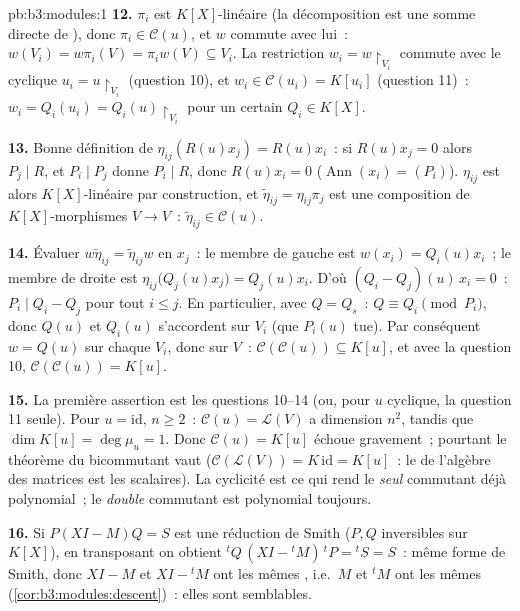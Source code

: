 \begin{solution}{pb:b3:modules:1}
\textbf{12.} $\pi_i$ est $K[X]$-linéaire (la décomposition est
une somme directe de ), donc $\pi_i \in \mathcal
C(u)$, et $w$ commute avec lui~: $w(V_i) = w\pi_i(V) = \pi_i
w(V) \subseteq V_i$. La restriction $w_i =
w\restriction_{V_i}$ commute avec le cyclique $u_i =
u\restriction_{V_i}$ (question 10), et $w_i \in \mathcal
C(u_i) = K[u_i]$ (question 11)~: $w_i = Q_i(u_i) =
Q_i(u)\restriction_{V_i}$ pour un certain $Q_i \in K[X]$.

\textbf{13.} Bonne définition de $\eta_{ij}(R(u)x_j) =
R(u)x_i$~: si $R(u)x_j = 0$ alors $P_j \mid R$, et $P_i \mid
P_j$ donne $P_i \mid R$, donc $R(u)x_i = 0$
($\operatorname{Ann}(x_i) = (P_i)$). $\eta_{ij}$ est alors
$K[X]$-linéaire par construction, et $\tilde\eta_{ij} =
\eta_{ij}\pi_j$ est une composition de $K[X]$-morphismes $V
\to V$~: $\tilde\eta_{ij} \in \mathcal C(u)$.

\textbf{14.} Évaluer $w\tilde\eta_{ij} = \tilde\eta_{ij}w$ en
$x_j$~: le membre de gauche est $w(x_i) = Q_i(u)x_i$~; le
membre de droite est $\eta_{ij}\bigl(Q_j(u)x_j\bigr) =
Q_j(u)x_i$. D'où $(Q_i - Q_j)(u)\,x_i = 0$~: $P_i \mid Q_i -
Q_j$ pour tout $i \leq j$. En particulier, avec $Q = Q_s$~: $Q
\equiv Q_i \pmod{P_i}$, donc $Q(u)$ et $Q_i(u)$ s'accordent sur
$V_i$ (que $P_i(u)$ tue). Par conséquent $w = Q(u)$ sur chaque
$V_i$, donc sur $V$~: $\mathcal C(\mathcal C(u)) \subseteq
K[u]$, et avec la question 10, $\mathcal C(\mathcal C(u)) =
K[u]$.

\textbf{15.} La première assertion est les questions 10--14
(ou, pour $u$ cyclique, la question 11 seule). Pour $u =
\mathrm{id}$, $n \geq 2$~: $\mathcal C(u) = \mathcal L(V)$ a
dimension $n^2$, tandis que $\dim K[u] = \deg\mu_u = 1$. Donc
$\mathcal C(u) = K[u]$ échoue gravement~; pourtant le théorème
du bicommutant vaut ($\mathcal C(\mathcal L(V)) =
K\,\mathrm{id} = K[u]$~: le  de l'algèbre des matrices
est les scalaires). La cyclicité est ce qui rend le
\emph{seul} commutant déjà polynomial~; le \emph{double}
commutant est polynomial toujours.

\textbf{16.} Si $P(XI - M)Q = S$ est une réduction de Smith
($P, Q$ inversibles sur $K[X]$), en transposant on obtient
${}^tQ\,(XI - {}^tM)\,{}^tP = {}^tS = S$~: même forme de Smith,
donc $XI - M$ et $XI - {}^tM$ ont les mêmes , i.e.\ $M$ et ${}^tM$ ont les mêmes  (\cref{cor:b3:modules:descent})~: elles sont
semblables.


\end{solution}
